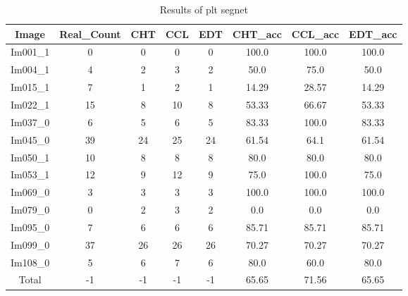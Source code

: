 \begin{table}[H]
\centering
\begin{tabular}{|c|c|c|c|c|c|c|c|}
\hline
 \textbf{Image} & \textbf{Real\_Count} & \textbf{CHT} & \textbf{CCL} & \textbf{EDT} & \textbf{CHT\_acc} & \textbf{CCL\_acc} & \textbf{EDT\_acc} \\ \hline
 Im001\_1 & 0 & 0 & 0 & 0 & 100.0 & 100.0 & 100.0 \\ 
 Im004\_1 & 4 & 2 & 3 & 2 & 50.0 & 75.0 & 50.0 \\ 
 Im015\_1 & 7 & 1 & 2 & 1 & 14.29 & 28.57 & 14.29 \\ 
 Im022\_1 & 15 & 8 & 10 & 8 & 53.33 & 66.67 & 53.33 \\ 
 Im037\_0 & 6 & 5 & 6 & 5 & 83.33 & 100.0 & 83.33 \\ 
 Im045\_0 & 39 & 24 & 25 & 24 & 61.54 & 64.1 & 61.54 \\ 
 Im050\_1 & 10 & 8 & 8 & 8 & 80.0 & 80.0 & 80.0 \\ 
 Im053\_1 & 12 & 9 & 12 & 9 & 75.0 & 100.0 & 75.0 \\ 
 Im069\_0 & 3 & 3 & 3 & 3 & 100.0 & 100.0 & 100.0 \\ 
 Im079\_0 & 0 & 2 & 3 & 2 & 0.0 & 0.0 & 0.0 \\ 
 Im095\_0 & 7 & 6 & 6 & 6 & 85.71 & 85.71 & 85.71 \\ 
 Im099\_0 & 37 & 26 & 26 & 26 & 70.27 & 70.27 & 70.27 \\ 
 Im108\_0 & 5 & 6 & 7 & 6 & 80.0 & 60.0 & 80.0 \\ \hline
 Total & -1 & -1 & -1 & -1 & 65.65 & 71.56 & 65.65 \\ 

\hline
\end{tabular}
\caption{Results of plt segnet}
\label{Results of plt segnet}
\end{table}
